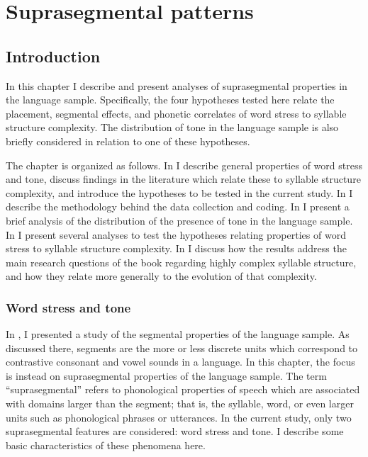 \chapter{Suprasegmental patterns}\label{sec:5}
\section{{Introduction}}\label{sec:5.1}\largerpage

  In this chapter I describe and present analyses of suprasegmental properties in the language sample. Specifically, the four hypotheses tested here relate the placement, segmental effects, and phonetic correlates of word stress to syllable structure complexity. The distribution of tone in the language sample is also briefly considered in relation to one of these hypotheses.

  The chapter is organized as follows. In  I describe general properties of word stress and tone, discuss findings in the literature which relate these to syllable structure complexity, and introduce the hypotheses to be tested in the current study. In  I describe the methodology behind the data collection and coding. In  I present a brief analysis of the distribution of the presence of tone in the language sample. In  I present several analyses to test the hypotheses relating properties of word stress to syllable structure complexity. In  I discuss how the results address the main research questions of the book regarding highly complex syllable structure, and how they relate more generally to the evolution of that complexity.

\subsection{Word stress and tone}\label{sec:5.1.1}

  In , I presented a study of the segmental properties of the language sample. As discussed there, segments are the more or less discrete units which correspond to contrastive consonant and vowel sounds in a language. In this chapter, the focus is instead on suprasegmental properties of the language sample. The term ``suprasegmental'' refers to phonological properties of speech which are associated with domains larger than the segment; that is, the syllable, word, or even larger units such as phonological phrases or utterances. In the current study, only two suprasegmental features are considered: word stress and tone. I describe some basic characteristics of these phenomena here.

